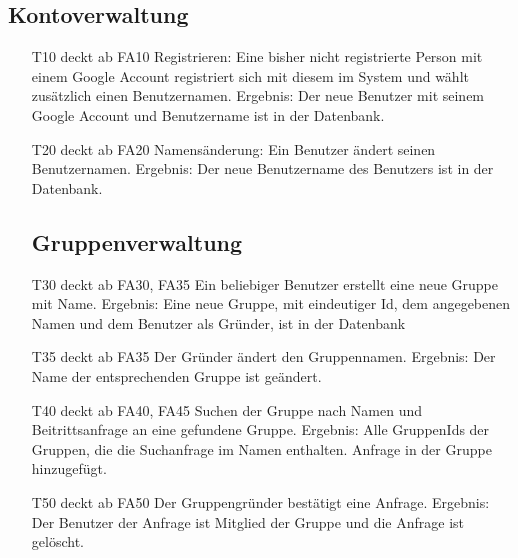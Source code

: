 \documentclass{scrartcl}
\begin{document}
	\subsection{Kontoverwaltung}
	\begin{itemize} 
		\item[T10] deckt ab FA10 \newline
		Registrieren: Eine bisher nicht registrierte Person mit einem Google Account registriert sich mit diesem im System 				und wählt zusätzlich einen Benutzernamen. \newline
		Ergebnis: Der neue Benutzer mit seinem Google Account und Benutzername ist in der Datenbank.

		\item[T20] deckt ab FA20\newline
		Namensänderung: Ein Benutzer ändert seinen Benutzernamen. \newline
		Ergebnis: Der neue Benutzername des Benutzers ist in der Datenbank. 
	
	\subsection{Gruppenverwaltung}
	
		\item[T30] deckt ab FA30, FA35\newline
		 Ein beliebiger Benutzer erstellt eine neue Gruppe mit Name. \newline
		Ergebnis: Eine neue Gruppe, mit eindeutiger Id, dem angegebenen Namen und dem Benutzer als Gründer, ist in der 			Datenbank

		\item[T35] deckt ab FA35 \newline
		Der Gründer ändert den Gruppennamen.\newline
		Ergebnis: Der Name der entsprechenden Gruppe ist geändert.

		\item[T40] deckt ab FA40, FA45  \newline
		Suchen der Gruppe nach Namen und Beitrittsanfrage an eine gefundene Gruppe. \newline
		Ergebnis: Alle GruppenIds der Gruppen, die die Suchanfrage im Namen enthalten. Anfrage in der Gruppe 		
		hinzugefügt.

		\item[T50] deckt ab FA50  \newline
		Der Gruppengründer bestätigt eine Anfrage. \newline
		Ergebnis: Der Benutzer der Anfrage ist \gls{Mitglied} der Gruppe und die Anfrage ist gelöscht.


\end{itemize}
\end{document}
